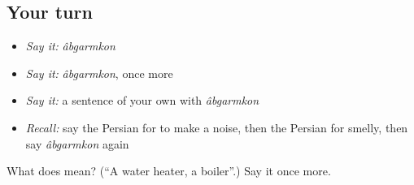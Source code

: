 \subsection*{Your turn}
\begin{itemize}
\raggedright
  \item \emph{Say it:} \emph{âbgarmkon}
  \item \emph{Say it:} \emph{âbgarmkon}, once more
  \item \emph{Say it:} a sentence of your own with \emph{âbgarmkon}
  \item \emph{Recall:} say the Persian for to make a noise, then the Persian for smelly, then say \emph{âbgarmkon} again
\end{itemize}

\begin{tcolorbox}[breakable,colback=teal!4,colframe=teal!35!black,title={Before you move on}]
What does   mean? (\textquotedblleft{}A water heater, a boiler\textquotedblright{}.) Say it once more.
\end{tcolorbox}
